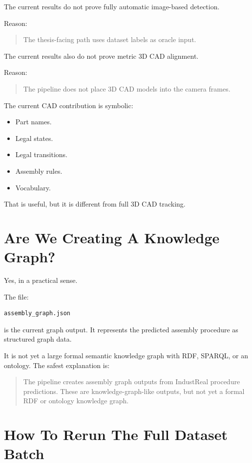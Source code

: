 \documentclass[11pt,a4paper]{article}
\begin{document}
The current results do not prove fully automatic image-based detection.

Reason:

\begin{quote}
The thesis-facing path uses dataset labels as oracle input.
\end{quote}

The current results also do not prove metric 3D CAD alignment.

Reason:

\begin{quote}
The pipeline does not place 3D CAD models into the camera frames.
\end{quote}

The current CAD contribution is symbolic:

\begin{itemize}[leftmargin=*]
    \item Part names.
    \item Legal states.
    \item Legal transitions.
    \item Assembly rules.
    \item Vocabulary.
\end{itemize}

That is useful, but it is different from full 3D CAD tracking.

\section{Are We Creating A Knowledge Graph?}

Yes, in a practical sense.

The file:

\begin{lstlisting}
assembly_graph.json
\end{lstlisting}

is the current graph output. It represents the predicted assembly procedure as structured graph data.

It is not yet a large formal semantic knowledge graph with RDF, SPARQL, or an ontology. The safest explanation is:

\begin{quote}
The pipeline creates assembly graph outputs from IndustReal procedure predictions. These are knowledge-graph-like outputs, but not yet a formal RDF or ontology knowledge graph.
\end{quote}

\section{How To Rerun The Full Dataset Batch}
\end{document}
